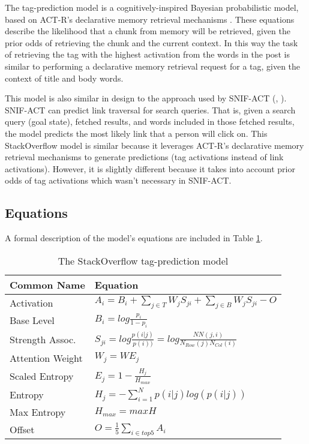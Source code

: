 \documentclass[10pt,letterpaper]{article}
\begin{document}
The tag-prediction model is a cognitively-inspired Bayesian probabilistic model, based on ACT-R's declarative memory retrieval mechanisms \cite{Anderson2004}.
These equations describe the likelihood that a chunk from memory will be retrieved, given the prior odds of retrieving the chunk and the current context.
In this way the task of retrieving the tag with the highest activation from the words in the post is similar to performing a declarative memory retrieval request for a tag, given the context of title and body words.

This model is also similar in design to the approach used by SNIF-ACT (, ). 
SNIF-ACT can predict link traversal for search queries.
That is, given a search query (goal state), fetched results, and words included in those fetched results, the model predicts the most likely link that a person will click on.
This StackOverflow model is similar because it leverages ACT-R's declarative memory retrieval mechanisms to generate predictions (tag activations instead of link activations).
However, it is slightly different because it takes into account prior odds of tag activations which wasn't necessary in SNIF-ACT.

\subsection{Equations}

A formal description of the model's equations are included in Table \ref{sample-table}. 

\renewcommand{\arraystretch}{1.5}%
\renewcommand{\tabcolsep}{.5mm}
\begin{table}[!ht]
  \begin{center} 
    \caption{The StackOverflow tag-prediction model} 
    \label{sample-table} 
    \vskip 0.12in
    \begin{tabular}{ll} 
      \hline
      Common Name &  Equation \\
      \hline
      Activation & 		$A_{i} = B_{i} + \sum_{j\in T}^{ } W_{j} S_{ji} + \sum_{j\in B}^{ } W_{j} S_{ji} - O$ \\
      Base Level & 		$B_{i} = log \frac{p_{i}}{1-p_{i}}$ \\
      Strength Assoc. &		$S_{ji} = log \frac{p(i|j)}{p(i))} = log \frac{NN(j,i)}{N_{Row}(j)N_{Col}(i)}$ \\
      Attention Weight	& 	$W_{j} = WE_{j}$ \\
      Scaled Entropy & 		$E_{j} = 1-\frac{H_{j}}{H_{max}}$ \\
      Entropy & 		$H_{j} = -\sum_{i=1}^{N}p(i|j)log\left (  p(i|j) \right )$ \\
      Max Entropy & 		$H_{max} = maxH$ \\
      Offset & 			$O = \frac{1}{5}\sum_{i\in top 5}^{ } A_{i}$ \\
      \hline
    \end{tabular} 
  \end{center} 
\end{table}
\end{document}
